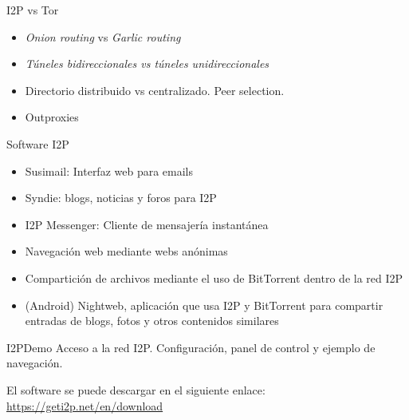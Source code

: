 \documentclass[spanish]{beamer}
\begin{document}
 
 
 \begin{frame}{I2P vs Tor}
 
 \begin{itemize}
	\item \textit{Onion routing} vs \textit{Garlic routing}
	\item \textit{Túneles bidireccionales vs túneles unidireccionales}
	\item Directorio distribuido vs centralizado. Peer selection.
	\item Outproxies
\end{itemize}
   
\end{frame}
 
 
 \begin{frame}{Software I2P}
 	
 
 \begin{itemize}
 	\item Susimail: Interfaz web  para emails
 	\item Syndie: blogs, noticias y foros para I2P
 	\item I2P Messenger: Cliente de mensajería instantánea
 	\item Navegación web mediante webs anónimas
 	\item Compartición de archivos mediante el uso de BitTorrent dentro de la red I2P
 	\item (Android) Nightweb, aplicación que usa I2P y BitTorrent para compartir entradas
 	de blogs, fotos y otros contenidos similares
 \end{itemize}
 	
 \end{frame}

\begin{frame}{I2P}{Demo}
Acceso a la red I2P. Configuración, panel de control y ejemplo de navegación.\\

\vspace{2em}

El software se puede descargar en el siguiente enlace: \href{https://geti2p.net/en/download}{\url{https://geti2p.net/en/download}}
	
\end{frame}
\end{document}
